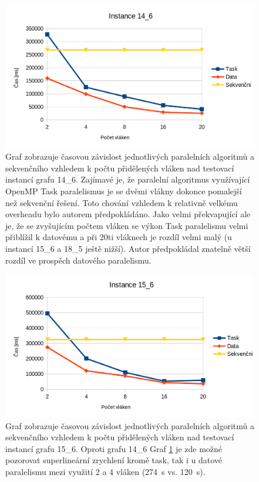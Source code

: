 \documentclass{article}%
\begin{document}
\begin{figure}[H]%
    \centering%
    \includegraphics[width=1\linewidth]{images/12_6_2.png}%

    \caption{  Graf zobrazuje časovou závislost jednotlivých paralelních algoritmů a sekvenčního vzhledem k počtu přidělených vláken nad testovací instancí grafu 14\_6. Zajímavé je, že paralelní algoritmus využívající OpenMP Task paralelismus je se dvěmi vlákny dokonce pomalejší než sekvenční řešení. Toto chování vzhledem k relativně velkému overheadu bylo autorem předpokládáno. Jako velmi překvapující ale je, že se zvyšujícím počtem vláken se výkon Task paralelismu velmi přiblížil k datovému a při 20ti vláknech je rozdíl velmi malý (u instancí 15\_6 a 18\_5 ještě nižší). Autor předpokládal znatelně větší rozdíl ve prospěch datového paralelismu.}%
    \label{fig:126}
\end{figure}


\begin{figure}[H]%
    \centering%
    \includegraphics[width=1\linewidth]{images/15_6.png}%

    \caption{ Graf zobrazuje časovou závislost jednotlivých paralelních algoritmů a sekvenčního vzhledem k počtu přidělených vláken nad testovací instancí grafu 15\_6. Oproti grafu 14\_6  Graf \ref{fig:126} je zde možné pozorovat superlineární zrychlení kromě task, tak i u datové paralelismu mezi využití 2 a 4 vláken (274~s vs. 120~s). }%
    \label{fig:156}
\end{figure}
\end{document}
